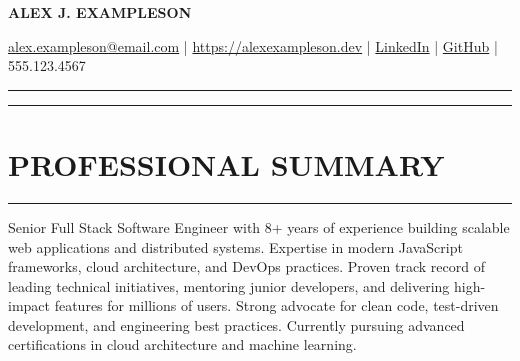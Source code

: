\documentclass[a4paper,10pt]{article}           %
\begin{document}
    \begin{center}
        \textbf{\Large ALEX J. EXAMPLESON}  %

        \vspace{0.1cm}                    %
        \href{mailto:alex.exampleson@email.com}{alex.exampleson@email.com} | \href{https://alexexampleson.dev}{https://alexexampleson.dev} | \href{https://linkedin.com/in/alexjexampleson}{LinkedIn} | \href{https://github.com/alexjexampleson}{GitHub} | 555.123.4567
    \end{center}

    \hrule
    \vspace{0.1cm}
    \hrule

    \vspace{0.2cm}

    \section*{PROFESSIONAL SUMMARY}      %
    \vspace{-0.5em}                      %
    \hrule                               %
    \vspace{0.3cm}                       %
    Senior Full Stack Software Engineer with 8+ years of experience building scalable web applications and distributed systems.
    Expertise in modern JavaScript frameworks, cloud architecture, and DevOps practices.
    Proven track record of leading technical initiatives, mentoring junior developers, and delivering high-impact features for millions of users.
    Strong advocate for clean code, test-driven development, and engineering best practices.
    Currently pursuing advanced certifications in cloud architecture and machine learning.
\end{document}

